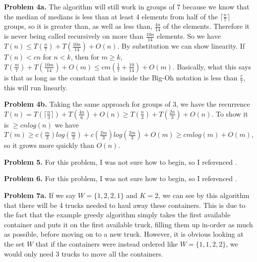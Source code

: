 \documentclass{article}
\begin{document}
\hfill

\textbf{Problem 4a.} The algorithm will still work in groups of 7 because we know that the median of medians is less than at least 4 elements from half of the $\lceil \frac{n}{7} \rceil$ groups, so it is greater than, as well as less than, $\frac{4n}{14}$ of the elements. Therefore it is never being called recursively on more than $\frac{10n}{14}$ elements. So we have $T(n) \leq T(\frac{n}{7}) + T(\frac{10n}{14}) + O(n)$. By substitution we can show linearity. If $T(n) < cn$ for $n < k$, then for $m \geq k$, $T(\frac{m}{7}) + T(\frac{10m}{14}) + O(m) \leq cm(\frac{1}{7} + \frac{10}{14}) + O(m)$. Basically, what this says is that as long as the constant that is inside the Big-Oh notation is less than $\frac{c}{7}$, this will run linearly. 

\hfill

\textbf{Problem 4b.} Taking the same approach for groups of 3, we have the recurrence $T(n) = T(\lceil \frac{n}{3} \rceil) + T(\frac{4n}{6}) + O(n) \geq T(\frac{n}{3}) + T(\frac{2n}{3}) + O(n)$. To show it is $\geq cnlog(n)$ we have $T(m) \geq c(\frac{m}{3})log(\frac{m}{3}) + c(\frac{2m}{3})log(\frac{2m}{3}) + O(m) \geq cmlog(m) + O(m)$, so it grows more quickly than $O(n)$.

\hfill

\textbf{Problem 5.} For this problem, I was not sure how to begin, so I referenced \cite{website:3}.

\hfill

\textbf{Problem 6.} For this problem, I was not sure how to begin, so I referenced \cite{website:3}.

\hfill

\textbf{Problem 7a.} If we say $W = \{1, 2, 2, 1\}$ and $K = 2$, we can see by this algorithm that there will be 4 trucks needed to haul away these containers. This is due to the fact that the example greedy algorithm simply takes the first available container and puts it on the first available truck, filling them up in-order as much as possible, before moving on to a new truck. However, it is obvious looking at the set $W$ that if the containers were instead ordered like $W = \{1, 1, 2, 2\}$, we would only need 3 trucks to move all the containers.

\newpage
 

\end{document}
